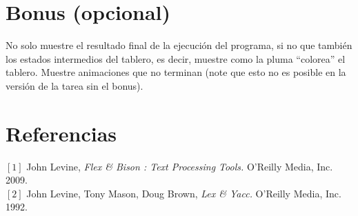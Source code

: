 \documentclass[dcc]{fcfmcourse}
\begin{document}
\section*{Bonus (opcional)}
No solo muestre el resultado final de la ejecución del programa, si no que también los estados intermedios del tablero, es decir, muestre como la pluma ``colorea'' el tablero. Muestre animaciones que no terminan (note que esto no es posible en la versión de la tarea sin el bonus).
\section*{Referencias}
$[1]$ John Levine, \textit{Flex \& Bison : Text Processing Tools.} O'Reilly Media, Inc. 2009.\\ 
$[2]$ John Levine, Tony Mason, Doug Brown, \textit{Lex \& Yacc.} O'Reilly Media, Inc. 1992.
\end{document}
